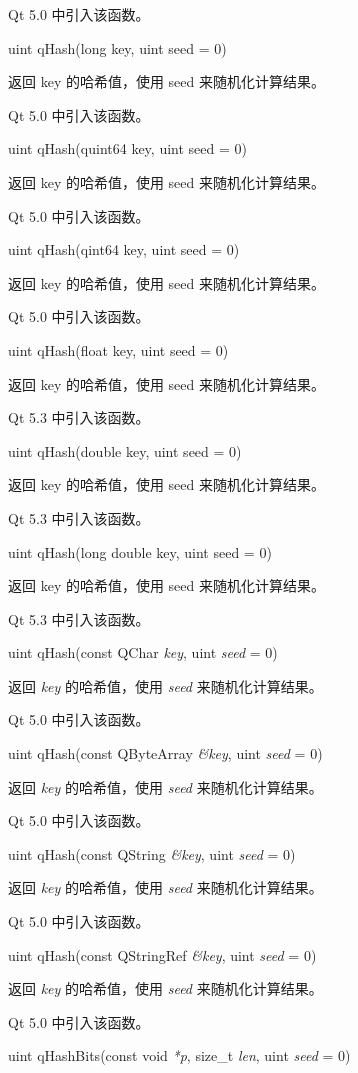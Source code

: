 Qt 5.0 中引入该函数。

uint qHash(long key, uint seed = 0)

返回 key 的哈希值，使用 seed 来随机化计算结果。

Qt 5.0 中引入该函数。

uint qHash(quint64 key, uint seed = 0)

返回 key 的哈希值，使用 seed 来随机化计算结果。

Qt 5.0 中引入该函数。

uint qHash(qint64 key, uint seed = 0)

返回 key 的哈希值，使用 seed 来随机化计算结果。

Qt 5.0 中引入该函数。

uint qHash(float key, uint seed = 0)

返回 key 的哈希值，使用 seed 来随机化计算结果。

Qt 5.3 中引入该函数。

uint qHash(double key, uint seed = 0)

返回 key 的哈希值，使用 seed 来随机化计算结果。

Qt 5.3 中引入该函数。

uint qHash(long double key, uint seed = 0)

返回 key 的哈希值，使用 seed 来随机化计算结果。

Qt 5.3 中引入该函数。

uint qHash(const QChar \emph{key}, uint \emph{seed} = 0)

返回 \emph{key} 的哈希值，使用 \emph{seed} 来随机化计算结果。

Qt 5.0 中引入该函数。

uint qHash(const QByteArray \emph{\&key},  uint \emph{seed} = 0)

返回 \emph{key} 的哈希值，使用 \emph{seed} 来随机化计算结果。

Qt 5.0 中引入该函数。

uint qHash(const QString \emph{\&key}, uint \emph{seed} = 0)

返回 \emph{key} 的哈希值，使用 \emph{seed} 来随机化计算结果。

Qt 5.0 中引入该函数。

uint qHash(const QStringRef \emph{\&key}, uint \emph{seed} = 0)

返回 \emph{key} 的哈希值，使用 \emph{seed} 来随机化计算结果。

Qt 5.0 中引入该函数。

uint qHashBits(const void \emph{*p}, size\_t \emph{len}, uint \emph{seed} = 0)

